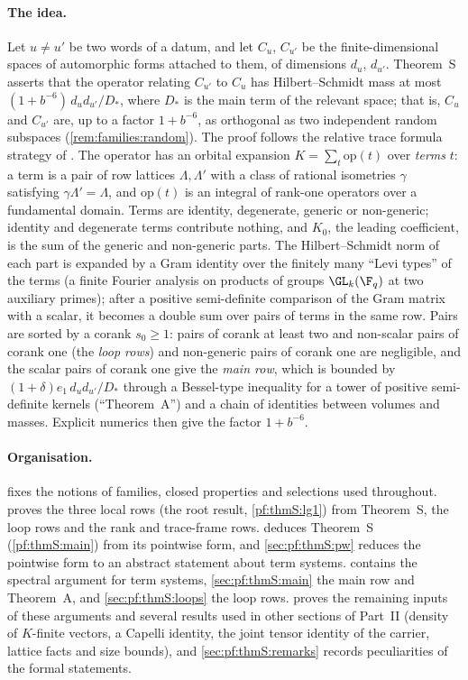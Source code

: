 \paragraph{The idea.}
Let $u\ne u'$ be two words of a datum, and let $C_u$, $C_{u'}$ be the finite-dimensional spaces of automorphic forms
attached to them, of dimensions $d_u$, $d_{u'}$. Theorem~S asserts that the operator relating $C_{u'}$ to $C_u$ has
Hilbert--Schmidt mass at most $(1+b^{-6})\,d_ud_{u'}/D_*$, where $D_*$ is the main term of the relevant space; that is,
$C_u$ and $C_{u'}$ are, up to a factor $1+b^{-6}$, as orthogonal as two independent random subspaces
(\cref{rem:families:random}). The proof follows the relative trace formula strategy of \cite{Announcement2026}.
The operator has an orbital expansion $K=\sum_t\mathrm{op}(t)$ over \emph{terms} $t$: a term is a pair of row
lattices $\Lambda,\Lambda'$ with a class of rational isometries $\gamma$ satisfying $\gamma\Lambda'=\Lambda$, and
$\mathrm{op}(t)$ is an integral of rank-one operators over a fundamental domain. Terms are identity, degenerate,
generic or non-generic; identity and degenerate terms contribute nothing, and $K_0$, the leading coefficient, is
the sum of the generic and non-generic parts. The Hilbert--Schmidt norm of each part is expanded by a Gram
identity over the finitely many ``Levi types'' of the terms (a finite Fourier analysis on products of groups
$\GL_k(\F_q)$ at two auxiliary primes); after a positive semi-definite comparison of the Gram matrix with a scalar,
it becomes a double sum over pairs of terms in the same row. Pairs are sorted by a corank $s_0\ge1$: pairs of corank
at least two and non-scalar pairs of corank one (the \emph{loop rows}) and non-generic pairs of corank one are
negligible, and the scalar pairs of corank one give the \emph{main row}, which is bounded by $(1+\delta)e_1\,
d_ud_{u'}/D_*$ through a Bessel-type inequality for a tower of positive semi-definite kernels (``Theorem~A'') and a
chain of identities between volumes and masses. Explicit numerics then give the factor $1+b^{-6}$.

\paragraph{Organisation.}
 fixes the notions of families, closed properties and selections used throughout.
 proves the three local rows (the root result, \cref{pf:thmS:lg1}) from Theorem~S, the loop
rows and the rank and trace-frame rows.  deduces Theorem~S (\cref{pf:thmS:main}) from its
pointwise form, and \cref{sec:pf:thmS:pw} reduces the pointwise form to an abstract statement about term systems.
 contains the spectral argument for term systems, \cref{sec:pf:thmS:main} the main row and
Theorem~A, and \cref{sec:pf:thmS:loops} the loop rows.  proves the remaining inputs of these
arguments and several results used in other sections of Part~II (density of $K$-finite vectors, a Capelli identity, the
joint tensor identity of the carrier, lattice facts and size bounds), and \cref{sec:pf:thmS:remarks} records
peculiarities of the formal statements.


